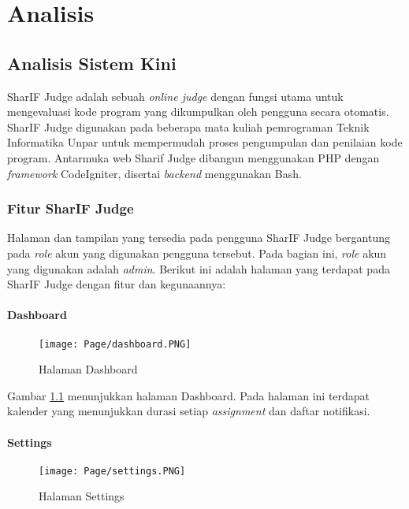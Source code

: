 \chapter{Analisis}
\label{chap:analisis}

\section{Analisis Sistem Kini}
\label{sec:3:analisiskini} 

SharIF Judge adalah sebuah \textit{online judge} dengan fungsi utama untuk mengevaluasi kode program yang dikumpulkan oleh pengguna secara otomatis. SharIF Judge digunakan pada beberapa mata kuliah pemrograman Teknik Informatika Unpar untuk mempermudah proses pengumpulan dan penilaian kode program. Antarmuka web Sharif Judge dibangun menggunakan PHP dengan \textit{framework} CodeIgniter, disertai \textit{backend} menggunakan Bash.

\subsection{Fitur SharIF Judge}
\label{subs:3:fitur}

Halaman dan tampilan yang tersedia pada pengguna SharIF Judge bergantung pada \textit{role} akun yang digunakan pengguna tersebut. Pada bagian ini, \textit{role} akun yang digunakan adalah \textit{admin}. Berikut ini adalah halaman yang terdapat pada SharIF Judge dengan fitur dan kegunaannya:

\subsubsection{Dashboard}
    \begin{figure}[H]
    	\centering  
    	\texttt{[image: Page/dashboard.PNG]}  
    	\caption{Halaman Dashboard}
    	\label{fig:3:dashboard} 
    \end{figure} 
    
    Gambar \ref{fig:3:dashboard} menunjukkan halaman Dashboard. Pada halaman ini terdapat kalender yang menunjukkan durasi setiap \textit{assignment} dan daftar notifikasi.
    
\subsubsection{Settings}
    \begin{figure}[H]
    	\centering  
    	\texttt{[image: Page/settings.PNG]}  
    	\caption{Halaman Settings}
    	\label{fig:3:settings} 
    \end{figure} 
    
